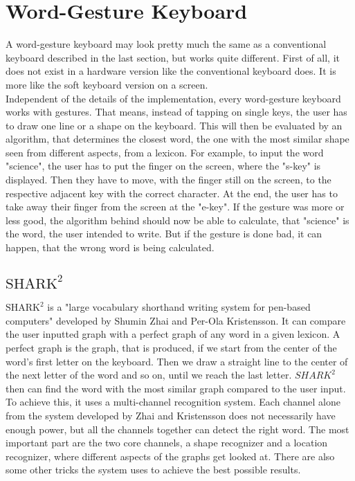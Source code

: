 \section{Word-Gesture Keyboard}
A word-gesture keyboard may look pretty much the same as a conventional keyboard described in the last section, but works quite different. First of all, it does not exist in a hardware version like the conventional keyboard does. It is more like the soft keyboard version on a screen.\\
Independent of the details of the implementation, every word-gesture keyboard works with gestures. That means, instead of tapping on single keys, the user has to draw one line or a shape on the keyboard. This will then be evaluated by an algorithm, that determines the closest word, the one with the most similar shape seen from different aspects, from a lexicon. For example, to input the word "science", the user has to put the finger on the screen, where the "s-key" is displayed. Then they have to move, with the finger still on the screen, to the respective adjacent key with the correct character. At the end, the user has to take away their finger from the screen at the "e-key". If the gesture was more or less good, the algorithm behind should now be able to calculate, that "science" is the word, the user intended to write. But if the gesture is done bad, it can happen, that the wrong word is being calculated. 

\subsection{$\text{SHARK}^2$}
\label{SHARK2}
$\text{SHARK}^2$ is a "large vocabulary shorthand writing system for pen-based computers" \cite{Kristensson2004SHARK2AL} developed by Shumin Zhai and Per-Ola Kristensson. It can compare the user inputted graph with a perfect graph of any word in a given lexicon. A perfect graph is the graph, that is produced, if we start from the center of the word's first letter on the keyboard. Then we draw a straight line to the center of the next letter of the word and so on, until we reach the last letter. $SHARK^2$ then can find the word with the most similar graph compared to the user input. To achieve this, it uses a multi-channel recognition system. Each channel alone from the system developed by Zhai and Kristensson \cite{Kristensson2004SHARK2AL} does not necessarily have enough power, but all the channels together can detect the right word. The most important part are the two core channels, a shape recognizer and a location recognizer, where different aspects of the graphs get looked at. There are also some other tricks the system uses to achieve the best possible results.\\
